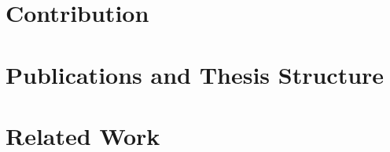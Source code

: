 \section{Contribution}
\section{Publications and Thesis Structure}
\section{Related Work}














